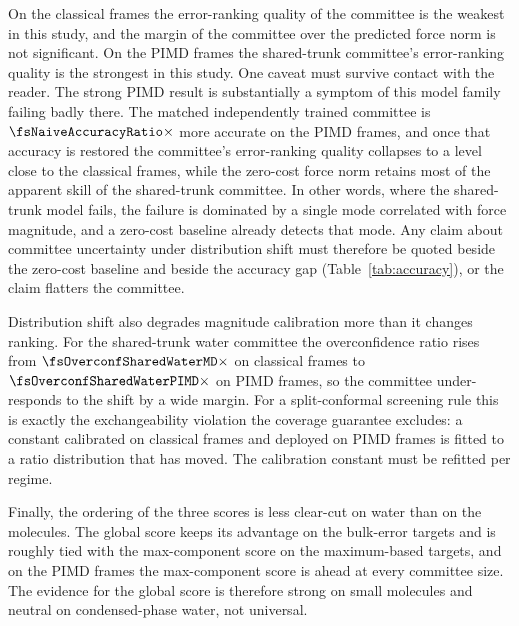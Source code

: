 On the classical frames the error-ranking quality of the committee is the
weakest in this study, and the margin of the committee over the predicted force
norm is not significant. On the PIMD frames the shared-trunk committee's
error-ranking quality is the strongest in this study. One caveat must survive
contact with the reader. The strong PIMD result is substantially a symptom of
this model family failing badly there. The matched independently trained
committee is $\fsNaiveAccuracyRatio\times$ more accurate on the PIMD frames,
and once that accuracy is restored the committee's error-ranking quality
collapses to a level close to the classical frames, while the zero-cost force
norm retains most of the apparent skill of the shared-trunk committee. In other
words, where the shared-trunk model fails, the failure is dominated by a single
mode correlated with force magnitude, and a zero-cost baseline already detects
that mode. Any claim about committee uncertainty under distribution shift must
therefore be quoted beside the zero-cost baseline and beside the accuracy gap
(Table~\ref{tab:accuracy}), or the claim flatters the committee.

Distribution shift also degrades magnitude calibration more than it changes
ranking. For the shared-trunk water committee the overconfidence ratio rises
from $\fsOverconfSharedWaterMD\times$ on classical frames to
$\fsOverconfSharedWaterPIMD\times$ on PIMD frames, so the committee
under-responds to the shift by a wide margin. For a split-conformal screening
rule this is exactly the exchangeability violation the coverage guarantee
excludes: a constant calibrated on classical frames and deployed on PIMD frames
is fitted to a ratio distribution that has moved. The calibration constant must
be refitted per regime.

Finally, the ordering of the three scores is less clear-cut on water than on
the molecules. The global score keeps its advantage on the bulk-error targets
and is roughly tied with the max-component score on the maximum-based targets,
and on the PIMD frames the max-component score is ahead at every committee
size. The evidence for the global score is therefore strong on small molecules
and neutral on condensed-phase water, not universal.


